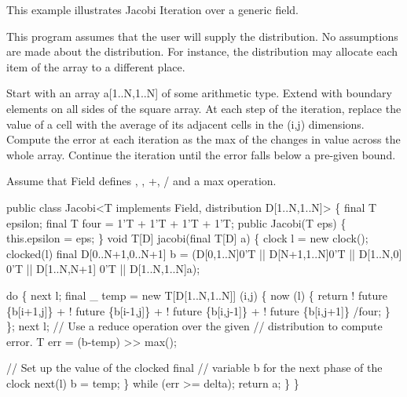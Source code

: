 
This example illustrates Jacobi Iteration over a generic field.

This program assumes that the user will supply the distribution. No
assumptions are made about the distribution. For instance, the
distribution may allocate each item of the array to a different place.

Start with an array {\cf a[1..N,1..N]} of some arithmetic type.  Extend
with {} boundary elements on all sides of the square array.  At
each step of the iteration, replace the value of a cell with the
average of its adjacent cells in the {\cf (i,j)} dimensions.  Compute the
error at each iteration as the max of the changes in value across the
whole array.  Continue the iteration until the error falls below a
pre-given bound.

Assume that {\cf Field} defines {}, {}, {\cf +}, {\cf /} and
a max operation.

\begin{x10}
public 
    class Jacobi<T implements Field, 
                 distribution D[1..N,1..N]> \{
  final T epsilon;
  final T four = 1'T + 1'T + 1'T + 1'T;
  public Jacobi(T eps) \{
    this.epsilon = eps;
  \}
  void T[D] jacobi(final T[D] a) \{
    clock l = new clock();
    clocked(l) final D[0..N+1,0..N+1] b 
       = (D[0,1..N]0'T
         || D[N+1,1..N]0'T
         || D[1..N,0] 0'T 
         || D[1..N,N+1] 0'T 
         || D[1..N,1..N]a);

     do \{
       next l;
       final \_ temp 
         = new T[D[1..N,1..N]] (i,j) \{
           now (l) \{
                 return
                   ! future \{b[i+1,j]\}
                 + ! future \{b[i-1,j]\}
                 + ! future \{b[i,j-1]\} 
                 + ! future \{b[i,j+1]\} /four;
          \}
        \};
       next l;
       // Use a reduce operation over the given 
       // distribution to compute error.
       T err = (b-temp) >> max();

      // Set up the value of the clocked final
      // variable b for the next phase of the clock
      next(l) b = temp;
     \} while (err >= delta);
     return a;
   \}
\}
\end{x10}
